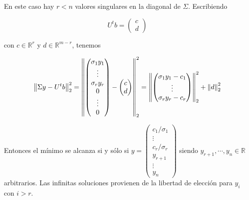 \begin{itemize}
En este caso hay $r < n$ valores singulares en la diagonal de $\Sigma$. Escribiendo

\[U^tb = \begin{pmatrix}
c \\ d
\end{pmatrix}\]

con $c \in \mathbb{R}^{r}$ y $d \in \mathbb{R}^{m - r}$, tenemos

\[\left\lVert\Sigma y - U^tb\right\rVert_2^2 = \left\lVert\begin{pmatrix}
\sigma_1 y_1 \\
\vdots \\
\sigma_r y_r \\
0 \\
\vdots \\
0
\end{pmatrix} - \begin{pmatrix}
c \\
d
\end{pmatrix}\right\rVert_2^2 =
\left\lVert\begin{pmatrix}
\sigma_1 y_1 - c_1\\
\vdots \\
\sigma_r y_r - c_r
\end{pmatrix}\right\rVert_2^2 + \left\lVert d\right\rVert_2^2
\]

Entonces el mínimo se alcanza si y sólo si $y = \begin{pmatrix}
c_1 / \sigma_1 \\ \vdots \\ c_r / \sigma_r \\ y_{r + 1} \\ \vdots \\ y_n
\end{pmatrix}$ siendo $y_{r + 1}, \cdots, y_n \in \mathbb{R}$ arbitrarios. Las infinitas soluciones provienen de la libertad de elección para $y_i$ con $i > r$.

\end{itemize}
